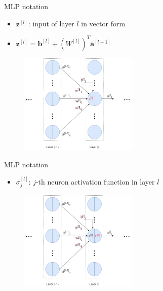 \begin{frame}{MLP notation}
    \begin{itemize}
        \item $\bm{z}^{[l]}$: input of layer $l$ in vector form
        \item $\bm{z}^{[l]} = \bm{b}^{[l]} + (W^{[l]})^T \bm{a}^{[l-1]}$
    \end{itemize}
    \begin{figure}[H]
        \centering
        \includegraphics[width=0.5\textwidth]{Figs/notation3.png}
    \end{figure}
\end{frame}

\begin{frame}{MLP notation}
    \begin{itemize}
        \item $\sigma^{[l]}_j$: $j$-th neuron activation function in layer $l$
    \end{itemize}
    \begin{figure}[H]
        \centering
        \includegraphics[width=0.5\textwidth]{Figs/notation4.png}
    \end{figure}
\end{frame}

